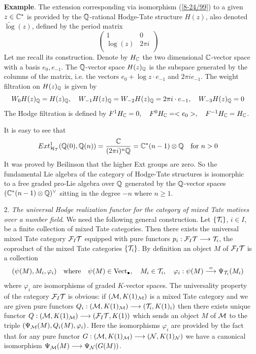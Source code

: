 \documentclass[10pt]{article}
\begin{document}
{\bf Example}. The extension  corresponding 
via isomorphism  (\ref{8-24/99}) to a given $z \in {\mathbb C}^*$ is provided by the 
${\mathbb Q}$-rational Hodge-Tate structure 
$H(z)$, also denoted $\widetilde \log (z)$,  defined by the period matrix 
$$
 \left (\begin{matrix}1&0 \\ \log( z)& 2 \pi i  \\\end{matrix}\right ) 
$$ 
Let me recall its construction. 
Denote by  $H_{{\mathbb C}}$ the two dimensional ${\mathbb C}$-vector space with a basis 
$e_0, e_{-1}$. 
The ${\mathbb Q}$-vector space $H(z)_{{\mathbb Q}}$ is the subspace generated by 
the columns of the matrix, i.e. the vectors 
$e_0 + \log z \cdot e_{-1}$ and $2 \pi i e_{-1}$. 
The weight filtration on $H(z)_{{\mathbb Q}}$ is given by 
$$
W_0H(z)_{{\mathbb Q}} = H(z)_{{\mathbb Q}}, 
\quad W_{-1}H(z)_{{\mathbb Q}} = W_{-2}H(z)_{{\mathbb Q}} = 2 \pi i \cdot e_{-1}, \quad 
W_{-3}H(z)_{{\mathbb Q}} = 0
$$
The Hodge filtration 
is defined by 
$
F^{1}H_{{\mathbb C}} = 0, \quad F^0H_{{\mathbb C}} = <e_0>, 
\quad F^{-1}H_{{\mathbb C}} = H_{{\mathbb C}}
$. 


It is easy to see that
$$
Ext^1_{{\cal H}_{T}}({\mathbb Q}(0),{\mathbb Q}(n)) = \frac{{\mathbb C}}{(2 \pi i)^n {\mathbb Q}} = {\mathbb C}^*(n-1)\otimes {{\mathbb Q}}
\quad \mbox{for $n > 0$}
$$
It was proved by Beilinson  that the higher Ext groups are zero. 
So the fundamental Lie algebra of the category of 
Hodge-Tate structures is isomorphic to a  free graded pro-Lie 
algebra over ${\mathbb Q}$ generated by the 
${\mathbb Q}$-vector spaces $({\mathbb C}^*(n-1)\otimes {{\mathbb Q}})^{\vee}$ sitting in the degree $-n$ 
where $n \geq 1$. 

2. {\it The universal Hodge realization functor for the category of mixed Tate motives over a 
number field}. 
We need the following general construction. Let $\{{\cal T}_i\}$, $i \in I$, be a finite 
collection of mixed Tate categories. Then there exists  the universal 
mixed Tate category ${\cal F}_{I}{\cal T}$ equipped with pure functors 
$p_i: {\cal F}_{I}{\cal T} \longrightarrow {\cal T}_i$, the coproduct of the mixed Tate categories 
$\{{\cal T}_i\}$. 
 By definition an object $M$ of ${\cal F}_{I}{\cal T}$
is  a collection 
$$
(\psi(M), M_i, \varphi_i) \quad \mbox{where} \quad \psi(M) \in {\rm Vect}_{\bullet}, \quad 
M_i \in  {\cal T}_i, \quad \varphi_i: \psi(M) \stackrel{=}{\longrightarrow} \Psi_{{\cal T}_i}(M_i)
$$
where  $\varphi_i$ are isomorphisms 
of graded $K$-vector spaces. The universality property of the category ${\cal F}_{I}{\cal T}$ 
is obvious: if $({\cal M}, K(1)_{{\cal M}})$ is a mixed Tate category and we are 
given pure functors $Q_i: ({\cal M}, K(1)_{{\cal M}}) \longrightarrow ({\cal T}_i, K(1)_{i})$ 
then there exists unique functor 
$Q: ({\cal M}, K(1)_{{\cal M}}) \longrightarrow ({\cal F}_{I}{\cal T}, K(1))$ which sends 
an object $M$ of ${\cal M}$ to the triple $(\Psi_{{\cal M}}(M), Q_i(M), \varphi_i)$. 
Here the isomorphisms $\varphi_i$ are provided by the fact that for any pure functor 
$G: ({\cal M}, K(1)_{{\cal M}}) \longrightarrow ({\cal N}, K(1)_{{\cal N}})$ we have a canonical 
isomorphism $\Psi_{{\cal M}}(M) \longrightarrow \Psi_{{\cal N}}(G(M))$. 
\end{document}
